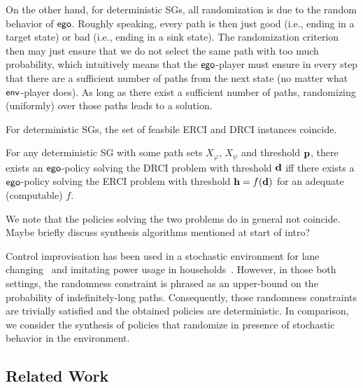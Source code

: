 On the other hand, for deterministic SGs, all randomization is due to the random behavior of $\mathsf{ego}$. Roughly speaking, every path is then just good (i.e., ending in a target state) or bad (i.e., ending in a sink state). The randomization criterion then may just ensure that we do not select the same path with too much probability, which intuitively means that the $\mathsf{ego}$-player must ensure in every step that there are a sufficient number of paths from the next state (no matter what $\mathsf{env}$-player does). 
As long as there exist a sufficient number of paths, randomizing (uniformly) over those paths leads to a solution.

	For deterministic SGs, the set of feasbile ERCI and DRCI instances coincide.
\begin{theorem}
For any deterministic SG with some path sets $X_\varphi$, $X_\psi$ and threshold $\mathbf{p}$, 
there exists an $\mathsf{ego}$-policy solving the DRCI problem with threshold $\mathbf{d}$ iff there exists a $\mathsf{ego}$-policy solving the ERCI problem with threshold $\mathbf{h} = f(\mathbf{d})$ for an adequate (computable) $f$.
\end{theorem}
We note that the policies solving the two problems do in general not coincide. 
\label{sec:related}
\color{red}
Maybe briefly discuss synthesis algorithms mentioned at start of intro?
\color{black}


Control improvisation has been used in a stochastic environment for lane changing~\cite{DBLP:conf/cdc/GeM18} and imitating power usage in households~\cite{DBLP:conf/iotdi/AkkayaFVDLS16}. However, in those both settings, the randomness constraint is phrased as an upper-bound on the probability of indefinitely-long paths. Consequently, those  randomness constraints are trivially satisfied and the obtained policies are deterministic. 
 In comparison, we consider the synthesis of policies that randomize in presence of stochastic behavior in the environment. 


\subsection{Related Work}
 
